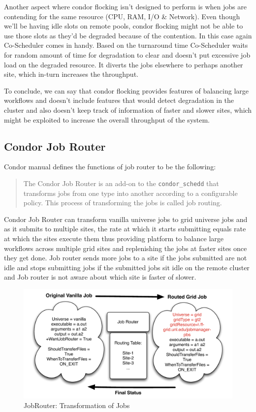 \documentclass[ms,electronic,double]{nuthesis}
\begin{document}
Another aspect where condor flocking isn't designed to perform is when jobs are 
contending for the same resource (CPU, RAM, I/O \& Network). Even though we'll be 
having idle slots on remote pools, condor flocking might not be able to use those 
slots as they'd be degraded because of the contention. In this case again 
Co-Scheduler comes in handy. Based on the turnaround time Co-Scheduler waits for random 
amount of time for degradation to clear and doesn't put excessive job load on the 
degraded resource. It diverts the jobs elsewhere to perhaps another site, which in-turn increases the 
throughput.

To conclude, we can say that condor flocking provides features of balancing 
large workflows and doesn't include features that would detect degradation in 
the cluster and also doesn't keep track of information of faster and 
slower sites, which might be exploited to increase the overall throughput of the system. 

\subsection{Condor Job Router}

Condor manual defines the functions of job router to be the following:
\begin{quotation}

The Condor Job Router is an add-on to the \texttt{condor\_schedd} that transforms jobs from one type into 
another according to a configurable policy. 
This process of transforming the jobs is called job routing.
\end{quotation}

Condor Job Router can transform vanilla universe jobs to grid universe jobs and 
as it submits to multiple sites, the rate at which it starts submitting equals 
rate at which the sites execute them thus providing platform to balance large 
workflows across multiple grid sites and replenishing the jobs at
faster sites once they get done. Job router sends more jobs to a site if 
the jobs submitted are not idle and stops submitting jobs if the submitted jobs 
sit idle on the remote cluster and Job router is not aware about which site is 
faster of slower.


\begin{figure}[htbp!]
\begin{center}
\includegraphics[scale=0.75]{images/jobRouter}
\caption{JobRouter: Transformation of Jobs}
\label{fig:JobRouter}
\end{center}
\end{figure}
\end{document}
